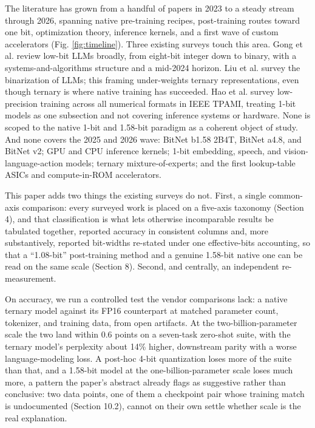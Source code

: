 \documentclass[11pt]{article}
\begin{document}
The literature has grown from a handful of papers in 2023 to a steady stream through
2026, spanning native pre-training recipes, post-training routes toward one bit,
optimization theory, inference kernels, and a first wave of custom accelerators
(Fig. \ref{fig:timeline}). Three existing surveys touch this area. Gong et al.
\cite{Gong2024-SurveyLowbit} review low-bit LLMs broadly, from eight-bit integer down to
binary, with a systems-and-algorithms structure and a mid-2024 horizon. Liu et al.
\cite{Liu2025-SurveyBNNLLM} survey the binarization of LLMs; this framing under-weights
ternary representations, even though ternary is where native training has succeeded.
Hao et al. \cite{Hao2025-LowPrecTrainingSurvey} survey low-precision training across all
numerical formats in IEEE TPAMI, treating 1-bit models as one subsection and not
covering inference systems or hardware. None is scoped to the native 1-bit and 1.58-bit
paradigm as a coherent object of study. And none covers the 2025 and 2026 wave: BitNet
b1.58 2B4T, BitNet a4.8, and BitNet v2; GPU and CPU inference kernels; 1-bit embedding,
speech, and vision-language-action models; ternary mixture-of-experts; and the first
lookup-table ASICs and compute-in-ROM accelerators.

This paper adds two things the existing surveys do not. First, a single common-axis
comparison: every surveyed work is placed on a five-axis taxonomy (Section 4), and that
classification is what lets otherwise incomparable results be tabulated together,
reported accuracy in consistent columns and, more substantively, reported bit-widths
re-stated under one effective-bits accounting, so that a ``1.08-bit'' post-training method
and a genuine 1.58-bit native one can be read on the same scale (Section 8). Second, and
centrally, an independent re-measurement.

On accuracy, we run a controlled test the vendor comparisons lack: a native ternary model
against its FP16 counterpart at matched parameter count, tokenizer, and training data,
from open artifacts. At the two-billion-parameter scale the two land within 0.6 points on
a seven-task zero-shot suite, with the ternary model's perplexity about 14\% higher,
downstream parity with a worse language-modeling loss. A post-hoc 4-bit quantization
loses more of the suite than that, and a 1.58-bit model at the one-billion-parameter
scale loses much more, a pattern the paper's abstract already flags as suggestive rather
than conclusive: two data points, one of them a checkpoint pair whose training match is
undocumented (Section 10.2), cannot on their own settle whether scale is the real
explanation.
\end{document}
